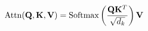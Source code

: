 \documentclass[preview]{standalone}
\begin{document}
\begin{align*}
\special{dvisvgm:raw <g id='unique000'>}\text{Attn}(\mathbf{Q},\mathbf{K},\mathbf{V}) = \text{Softmax}\left(\frac{\mathbf{Q}\mathbf{K}^T}{\sqrt{d_k}}\right)\mathbf{V}\special{dvisvgm:raw </g>}
\end{align*}
\end{document}
